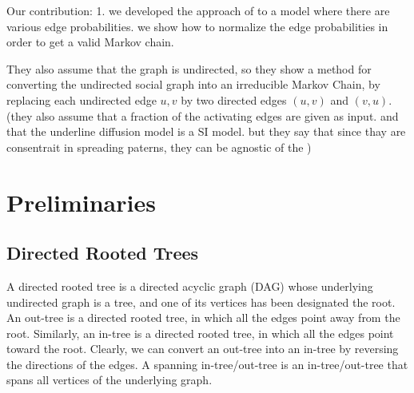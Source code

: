 \documentclass[sigconf,anonymous]{aamas}
\begin{document}
Our contribution:
1. we developed the approach of \cite{kumar2017temporally} to a model where there are various edge probabilities. we show how to normalize the edge probabilities in order to get a valid Markov chain.


They also assume that the graph is undirected, so they show a method for converting the undirected social graph into an irreducible Markov Chain, by replacing each undirected edge ${u,v}$ by two directed edges $(u,v)$ and $(v,u)$.
(they also assume that a fraction of the activating edges are given as input. and that the underline diffusion model is a SI model. but they say that since thay are consentrait in spreading paterns, they can be agnostic of the )



\section {Preliminaries}
\subsection{Directed Rooted Trees}
A directed rooted tree is a directed acyclic graph (DAG) whose underlying undirected graph is a tree, and one of its vertices has been designated the root.
An out-tree is a directed rooted tree, in which all the edges point away from the root. Similarly, an in-tree is a directed rooted tree, in which all the edges point toward the root. Clearly, we can convert an out-tree into an in-tree by reversing the directions of the edges. A spanning in-tree/out-tree is an in-tree/out-tree that spans all vertices of the underlying graph. 
\end{document}
